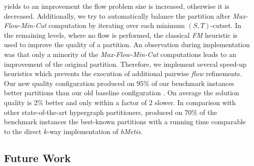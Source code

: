 yields to an improvement the flow problem size is increased, otherwise it is decreased. 
Additionally, we try to automatically balance the partition after \emph{Max-Flow-Min-Cut}
computation by iterating over each minimum $(S,T)$-cutset. In the remaining levels, 
where no flow is performed, the classical \emph{FM} heuristic is used to improve the quality 
of a partition. An observation during implementation was that only a minority of 
the \emph{Max-Flow-Min-Cut} computations leads to an improvement of the original partition. 
Therefore, we implement several speed-up heuristics which prevents the
execution of additional pairwise \emph{flow} refinements. \\
Our new quality configuration  produced on $95\%$ of our benchmark instances
better partitions than our old baseline configuration . On average the solution 
quality is $2\%$ better and only within a factor of $2$ slower. In comparison with other 
state-of-the-art hypergraph partitioners,  produced on $70\%$ of the benchmark instances
the best-known partitions with a running time comparable to the direct $k$-way implementation
of \emph{hMetis}.


\subsection{Future Work}

